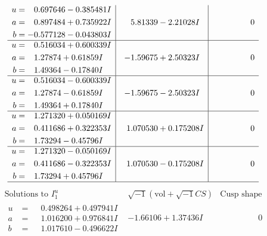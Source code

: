 \documentclass[1p]{elsarticle_modified}
\theoremstyle{definition}
\newcommand{\I}{\sqrt{-1}}
\begin{document}
$$\begin{array}{c|c|c}
\begin{aligned}
u &= \phantom{-}0.697646 - 0.385481 I \\
a &= \phantom{-}0.897484 + 0.735922 I \\
b &= -0.577128 - 0.043803 I\end{aligned}
 & \phantom{-}5.81339 - 2.21028 I & \phantom{-0.000000 } 0 \\ \hline\begin{aligned}
u &= \phantom{-}0.516034 + 0.600339 I \\
a &= \phantom{-}1.27874 + 0.61859 I \\
b &= \phantom{-}1.49364 - 0.17840 I\end{aligned}
 & -1.59675 + 2.50323 I & \phantom{-0.000000 } 0 \\ \hline\begin{aligned}
u &= \phantom{-}0.516034 - 0.600339 I \\
a &= \phantom{-}1.27874 - 0.61859 I \\
b &= \phantom{-}1.49364 + 0.17840 I\end{aligned}
 & -1.59675 - 2.50323 I & \phantom{-0.000000 } 0 \\ \hline\begin{aligned}
u &= \phantom{-}1.271320 + 0.050169 I \\
a &= \phantom{-}0.411686 + 0.322353 I \\
b &= \phantom{-}1.73294 - 0.45796 I\end{aligned}
 & \phantom{-}1.070530 + 0.175208 I & \phantom{-0.000000 } 0 \\ \hline\begin{aligned}
u &= \phantom{-}1.271320 - 0.050169 I \\
a &= \phantom{-}0.411686 - 0.322353 I \\
b &= \phantom{-}1.73294 + 0.45796 I\end{aligned}
 & \phantom{-}1.070530 - 0.175208 I & \phantom{-0.000000 } 0\\
 \hline 
 \end{array}$$\newpage$$\begin{array}{c|c|c}  
\text{Solutions to }I^u_{1}& \I (\text{vol} + \sqrt{-1}CS) & \text{Cusp shape}\\
 \hline 
\begin{aligned}
u &= \phantom{-}0.498264 + 0.497941 I \\
a &= \phantom{-}1.016200 + 0.976841 I \\
b &= \phantom{-}1.017610 - 0.496622 I\end{aligned}
 & -1.66106 + 1.37436 I & \phantom{-0.000000 } 0 \\ \hline\begin{aligned}

\end{aligned}
\end{array}$$
\end{document}
